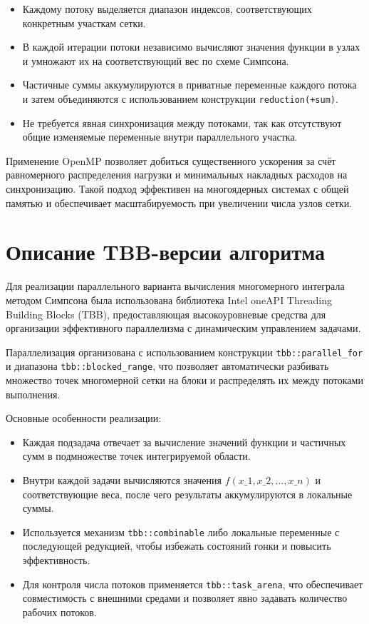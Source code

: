 \documentclass[a4paper,12pt]{article}
\begin{document}
\begin{itemize}
    \item Каждому потоку выделяется диапазон индексов, соответствующих конкретным участкам сетки.
    
    \item В каждой итерации потоки независимо вычисляют значения функции в узлах и умножают их на соответствующий вес по схеме Симпсона.
    
    \item Частичные суммы аккумулируются в приватные переменные каждого потока и затем объединяются с использованием конструкции \texttt{reduction(+\:sum)}.
    
    \item Не требуется явная синхронизация между потоками, так как отсутствуют общие изменяемые переменные внутри параллельного участка.
\end{itemize}

Применение OpenMP позволяет добиться существенного ускорения за счёт равномерного распределения нагрузки и минимальных накладных расходов на синхронизацию. Такой подход эффективен на многоядерных системах с общей памятью и обеспечивает масштабируемость при увеличении числа узлов сетки.


\section{Описание TBB-версии алгоритма}

Для реализации параллельного варианта вычисления многомерного интеграла методом Симпсона была использована библиотека Intel oneAPI Threading Building Blocks (TBB), предоставляющая высокоуровневые средства для организации эффективного параллелизма с динамическим управлением задачами.

Параллелизация организована с использованием конструкции \texttt{tbb::parallel\_for} и диапазона \texttt{tbb::blocked\_range}, что позволяет автоматически разбивать множество точек многомерной сетки на блоки и распределять их между потоками выполнения.

Основные особенности реализации:

\begin{itemize}
    \item Каждая подзадача отвечает за вычисление значений функции и частичных сумм в подмножестве точек интегрируемой области.
    
    \item Внутри каждой задачи вычисляются значения $f(x\_1, x\_2, \dots, x\_n)$ и соответствующие веса, после чего результаты аккумулируются в локальные суммы.
    
    \item Используется механизм \texttt{tbb::combinable} либо локальные переменные с последующей редукцией, чтобы избежать состояний гонки и повысить эффективность.
    
    \item Для контроля числа потоков применяется \texttt{tbb::task\_arena}, что обеспечивает совместимость с внешними средами и позволяет явно задавать количество рабочих потоков.
\end{itemize}
\end{document}

